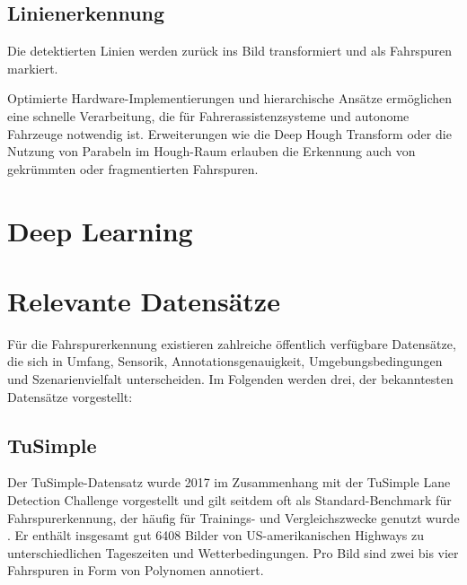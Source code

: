     \subsection{Linienerkennung}
        Die detektierten Linien werden zurück ins Bild transformiert und als Fahrspuren markiert. 
        
        Optimierte Hardware-Implementierungen und hierarchische Ansätze ermöglichen eine schnelle Verarbeitung, die für Fahrerassistenzsysteme und autonome Fahrzeuge notwendig ist.
        Erweiterungen wie die Deep Hough Transform oder die Nutzung von Parabeln im Hough-Raum erlauben die Erkennung auch von gekrümmten oder fragmentierten Fahrspuren.


\section{Deep Learning}

\section{Relevante Datensätze}
    Für die Fahrspurerkennung existieren zahlreiche öffentlich verfügbare Datensätze, die sich in Umfang, Sensorik, Annotationsgenauigkeit, Umgebungsbedingungen und Szenarienvielfalt unterscheiden.
    Im Folgenden werden drei, der bekanntesten Datensätze vorgestellt:

\label{chapter_datasets}
    \subsection{TuSimple}
    Der TuSimple-Datensatz wurde 2017 im Zusammenhang mit der TuSimple Lane Detection Challenge vorgestellt und gilt seitdem oft als Standard-Benchmark für Fahrspurerkennung, der häufig für Trainings- und Vergleichszwecke genutzt wurde \cite{tusimple_lane_detection}.
    Er enthält insgesamt gut 6408 Bilder von US-amerikanischen Highways zu unterschiedlichen Tageszeiten und Wetterbedingungen.
    Pro Bild sind zwei bis vier Fahrspuren in Form von Polynomen annotiert.

